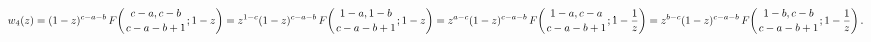\[w_{4}(z)=(1-z)^{c-a-b}\mathop{F\/}\nolimits\!\left({c-a,c-b\atop c-a-b+1};1-z%
\right)=z^{1-c}(1-z)^{c-a-b}\mathop{F\/}\nolimits\!\left({1-a,1-b\atop c-a-b+1%
};1-z\right)=z^{a-c}(1-z)^{c-a-b}\mathop{F\/}\nolimits\!\left({1-a,c-a\atop c-%
a-b+1};1-\frac{1}{z}\right)=z^{b-c}(1-z)^{c-a-b}\mathop{F\/}\nolimits\!\left({%
1-b,c-b\atop c-a-b+1};1-\frac{1}{z}\right).\]